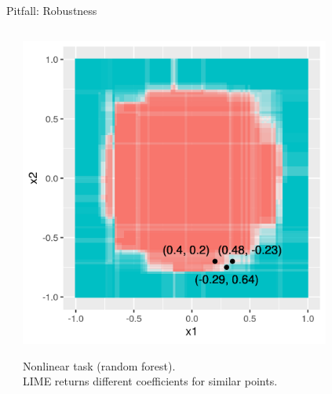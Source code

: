 \documentclass[10pt,compress,t,notes=noshow, xcolor=table]{beamer}
\begin{document}
\begin{frame}{Pitfall: Robustness }
\begin{columns}[totalwidth=\textwidth]
\begin{column}{0.5\textwidth}
\begin{center}
		\end{center}
	\end{column}
	\begin{column}{0.5\textwidth}
		\begin{center}
	\includegraphics[width=0.8\textwidth]{figure/lime_robustness_2.png}
	
	{Nonlinear task (random forest). 
    \\LIME returns different coefficients for similar points.}
	
	\end{center}
\end{column}
\end{columns}
\end{frame}
\end{document}

